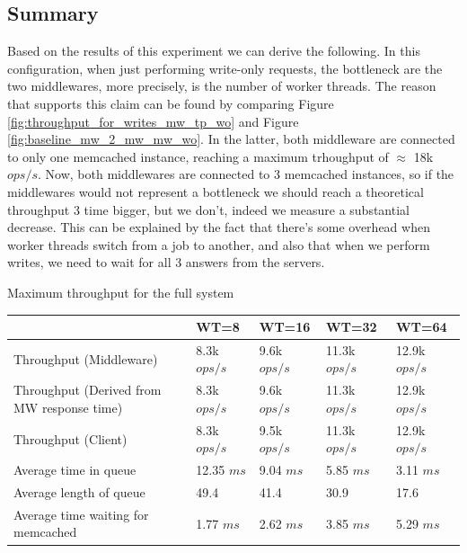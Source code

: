 \documentclass[11pt,a4paper]{article}
\begin{document}
\subsection{Summary}

Based on the results of this experiment we can derive the following.
In this configuration, when just performing write-only requests, the bottleneck are the two middlewares, more precisely, is the number of worker threads. 
The reason that supports this claim can be found by comparing Figure \ref{fig:throughput_for_writes_mw_tp_wo} and Figure \ref{fig:baseline_mw_2_mw_mw_wo}. In the latter, both middleware are connected to only one memcached instance, reaching a maximum trhoughput of $\approx$ 18k $ops/s$. Now, both middlewares are connected to 3 memcached instances, so if the middlewares would not represent a bottleneck we should reach a theoretical throughput 3 time bigger, but we don't, indeed we measure a substantial decrease. This can be explained by the fact  that there's some overhead when worker threads switch from a job to another, and also that when we perform writes, we need to wait for all 3 answers from the servers.\\


\begin{center}
	{Maximum throughput for the full system}
	\begin{tabular}{|l|p{1.5cm}|p{1.5cm}|p{1.5cm}|p{1.5cm}|}
		\hline                                            & WT=8         & WT=16        & WT=32         & WT=64         \\ 
		\hline Throughput (Middleware)                    & 8.3k $ops/s$ & 9.6k $ops/s$ & 11.3k $ops/s$ & 12.9k $ops/s$ \\ 
		\hline Throughput (Derived from MW response time) & 8.3k $ops/s$ & 9.6k $ops/s$ & 11.3k $ops/s$ & 12.9k $ops/s$ \\ 
		\hline Throughput (Client)                        & 8.3k $ops/s$ & 9.5k $ops/s$ & 11.3k $ops/s$ & 12.9k $ops/s$ \\ 
		\hline Average time in queue                      & 12.35 $ms$   & 9.04 $ms$    & 5.85 $ms$     & 3.11 $ms$     \\ 
		\hline Average length of queue                    & 49.4         & 41.4         & 30.9          & 17.6          \\ 
		\hline Average time waiting for memcached         & 1.77 $ms$    & 2.62 $ms$    & 3.85 $ms$     & 5.29 $ms$     \\ 
		\hline 
	\end{tabular}
\end{center}
\end{document}
